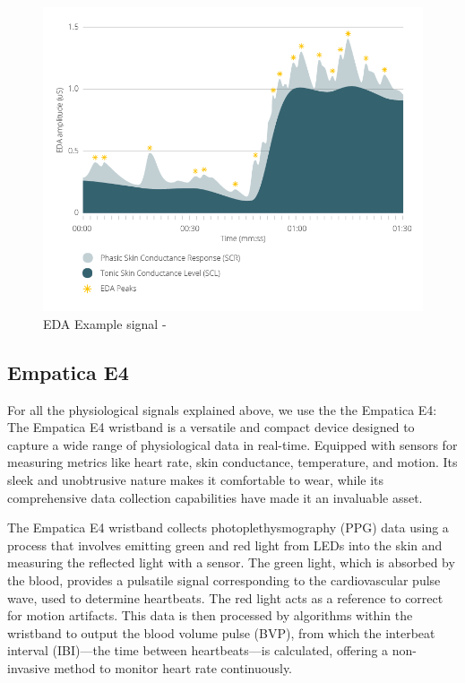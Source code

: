 \begin{figure}[hb]
	\centering
	\includegraphics[width=\columnwidth]{images/EDA-example-graph.png}
	\caption{EDA Example signal - \parencite{eda}}
	\label{fig:eda sig}
\end{figure}

\subsection{Empatica E4}
For all the physiological signals explained above, we use the the Empatica E4:
The Empatica E4 wristband is a versatile and compact device designed to capture a wide range of physiological data in real-time. Equipped with sensors for measuring metrics like heart rate, skin conductance, temperature, and motion. Its sleek and unobtrusive nature makes it comfortable to wear, while its comprehensive data collection capabilities have made it an invaluable asset.

The Empatica E4 wristband collects photoplethysmography (PPG) data using a process that involves emitting green and red light from LEDs into the skin and measuring the reflected light with a sensor. The green light, which is absorbed by the blood, provides a pulsatile signal corresponding to the cardiovascular pulse wave, used to determine heartbeats. The red light acts as a reference to correct for motion artifacts. This data is then processed by algorithms within the wristband to output the blood volume pulse (BVP), from which the interbeat interval (IBI)—the time between heartbeats—is calculated, offering a non-invasive method to monitor heart rate continuously.

